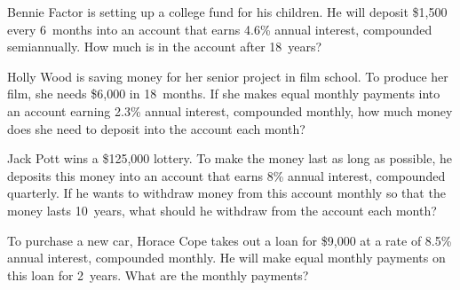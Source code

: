 \documentclass[11pt,letterpaper]{article}
\begin{document}

 Bennie Factor is setting up a college fund for his children. He will deposit \$1,500 every 6~months into an account that earns 4.6\% annual interest, compounded semiannually. How much is in the account after 18~years?



\newpage



 Holly Wood is saving money for her senior project in film school. To produce her film, she needs \$6,000 in 18~months. If she makes equal monthly payments into an account earning 2.3\% annual interest, compounded monthly, how much money does she need to deposit into the account each month?



\newpage



 Jack Pott wins a \$125,000 lottery. To make the money last as long as possible, he deposits this money into an account that earns 8\% annual interest, compounded quarterly. If he wants to withdraw money from this account monthly so that the money lasts 10~years, what should he withdraw from the account each month?



\newpage



 To purchase a new car, Horace Cope takes out a loan for \$9,000 at a rate of 8.5\% annual interest, compounded monthly. He will make equal monthly payments on this loan for 2~years. What are the monthly payments?
\end{document}
